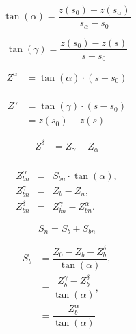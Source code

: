 \documentclass[10pt,a4paper]{article}
\begin{document}
	
	\begin{equation}
		\tan(\alpha) = \frac{z(s_0) - z(s_{\alpha})}{s_{\alpha} - s_0}
	\end{equation}

	\begin{equation}
		\tan(\gamma) = \frac{z(s_0) - z(s)}{s - s_0}
	\end{equation}
	
	\begin{equation}
		\begin{split}
			Z^{\alpha} & = \tan(\alpha) \cdot (s - s_0) \\
		\end{split}
	\end{equation}

	\begin{equation}
		\begin{split}
			Z^{\gamma} & = \tan(\gamma) \cdot (s - s_0) \\
			& = z(s_0) - z(s)
		\end{split}
	\end{equation}

	\begin{equation}
		\begin{split}
			Z^{\delta} & = Z_{\gamma} - Z_{\alpha} \\
		\end{split}
	\end{equation}
	
	\begin{eqnarray}\label{equation:intensity} 
		Z^{\alpha}_{bn} &=& S_{bn} \cdot \tan(\alpha), \\
		Z^{\gamma}_{bn} &=& Z_b -Z_{n}, \\
		Z^\delta_{bn}  &=& Z^{\gamma}_{bn} - Z^{\alpha}_{bn}.
	\end{eqnarray}

	\begin{equation}
		S_n = S_b + S_{bn}
	\end{equation}

	\begin{equation}
		\begin{split}
			S_b & = \dfrac{Z_0 - Z_b - Z_b^{\delta}}{\tan(\alpha)}, \\
			& = \dfrac{Z_b^{\gamma} - Z_b^{\delta}}{\tan(\alpha)}, \\	
			& = \dfrac{Z_b^{\alpha}}{\tan(\alpha)}
		\end{split}
	\end{equation}
\end{document}
